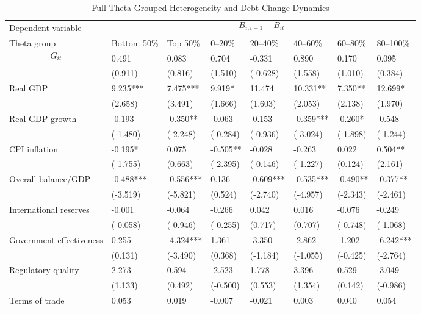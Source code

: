 \begin{table}[H]\centering
\begin{threeparttable}
\caption{Full-Theta Grouped Heterogeneity and Debt-Change Dynamics}
\label{tab:theta_group_heterogeneity_debt}
\scriptsize
\begin{tabularx}{\textwidth}{lYYYYYYY}
\toprule
Dependent variable &  \\
\cmidrule(lr){2-8}
Theta group & Bottom 50\% & Top 50\% & 0--20\% & 20--40\% & 40--60\% & 60--80\% & 80--100\% \\
\midrule
$$G_{it}$$ & 0.491 & 0.083 & 0.704 & -0.331 & 0.890 & 0.170 & 0.095 \\
  & (0.911) & (0.816) & (1.510) & (-0.628) & (1.558) & (1.010) & (0.384) \\
Real GDP & 9.235*** & 7.475*** & 9.919* & 11.474 & 10.331** & 7.350** & 12.699* \\
  & (2.658) & (3.491) & (1.666) & (1.603) & (2.053) & (2.138) & (1.970) \\
Real GDP growth & -0.193 & -0.350** & -0.063 & -0.153 & -0.359*** & -0.260* & -0.548 \\
  & (-1.480) & (-2.248) & (-0.284) & (-0.936) & (-3.024) & (-1.898) & (-1.244) \\
CPI inflation & -0.195* & 0.075 & -0.505** & -0.028 & -0.263 & 0.022 & 0.504** \\
  & (-1.755) & (0.663) & (-2.395) & (-0.146) & (-1.227) & (0.124) & (2.161) \\
Overall balance/GDP & -0.488*** & -0.556*** & 0.136 & -0.609*** & -0.535*** & -0.490** & -0.377** \\
  & (-3.519) & (-5.821) & (0.524) & (-2.740) & (-4.957) & (-2.343) & (-2.461) \\
International reserves & -0.001 & -0.064 & -0.266 & 0.042 & 0.016 & -0.076 & -0.249 \\
  & (-0.058) & (-0.946) & (-0.255) & (0.717) & (0.707) & (-0.748) & (-1.068) \\
Government effectiveness & 0.255 & -4.324*** & 1.361 & -3.350 & -2.862 & -1.202 & -6.242*** \\
  & (0.131) & (-3.490) & (0.368) & (-1.184) & (-1.055) & (-0.425) & (-2.764) \\
Regulatory quality & 2.273 & 0.594 & -2.523 & 1.778 & 3.396 & 0.529 & -3.049 \\
  & (1.133) & (0.492) & (-0.500) & (0.553) & (1.354) & (0.142) & (-0.986) \\
Terms of trade & 0.053 & 0.019 & -0.007 & -0.021 & 0.003 & 0.040 & 0.054 \\

\end{tabularx}
\end{threeparttable}
\end{table}
